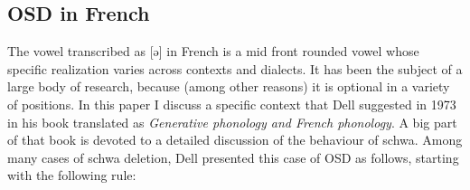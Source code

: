 \documentclass{article}
\begin{document}
\subsection{OSD in French}
The vowel transcribed as [ə] in French is a mid front rounded vowel whose specific realization varies across contexts and dialects.  It has been the subject of a large body of research,  because (among other reasons) it is optional in a variety of positions.  In this paper I discuss a specific context that Dell suggested in 1973 in his book translated as \textit{Generative phonology and French phonology}.  A big part of that book is devoted to a detailed discussion of the behaviour of schwa. Among many cases of schwa deletion, Dell presented this case of OSD as follows, starting with the following rule:\\
\end{document}

